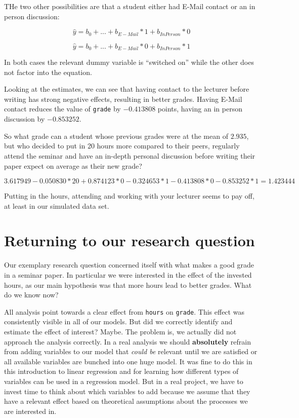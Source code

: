 \documentclass[
]{book}
\begin{document}
THe two other possibilities are that a student either had E-Mail contact or an
in person discussion:

\[\hat{y} = b_0 + ... + b_{E-Mail} * 1 + b_{In Person} * 0\]

\[\hat{y} = b_0 + ... + b_{E-Mail} * 0 + b_{In Person} * 1\]

In both cases the relevant dummy variable is ``switched on'' while the other does
not factor into the equation.

Looking at the estimates, we can see that having contact to the lecturer before
writing has strong negative effects, resulting in better grades. Having E-Mail
contact reduces the value of \texttt{grade} by \(-0.413808\) points, having an in person
discussion by \(-0.853252\).

So what grade can a student whose previous grades were at the mean of \(2.935\),
but who decided to put in 20 hours more compared to their peers, regularly
attend the seminar and have an in-depth personal discussion before writing their
paper expect on average as their new grade?

\[3.617949 - 0.050830 * 20 + 0.874123 * 0 - 0.324653 * 1 - 0.413808 * 0 - 0.853252 * 1 = 1.423444\]

Putting in the hours, attending and working with your lecturer seems to pay off,
at least in our simulated data set.

\hypertarget{returning-to-our-research-question}{%
\section{Returning to our research question}\label{returning-to-our-research-question}}

Our exemplary research question concerned itself with what makes a good grade in
a seminar paper. In particular we were interested in the effect of the invested
hours, as our main hypothesis was that more hours lead to better grades. What do
we know now?

All analysis point towards a clear effect from \texttt{hours} on \texttt{grade}. This effect
was consistently visible in all of our models. But did we correctly identify
and estimate the effect of interest? Maybe. The problem is, we actually did not
approach the analysis correctly. In a real analysis we should \textbf{absolutely}
refrain from adding variables to our model that \emph{could be} relevant until we are
satisfied or all available variables are bunched into one huge model. It was
fine to do this in this introduction to linear regression and for learning how
different types of variables can be used in a regression model. But in a real
project, we have to invest time to think about which variables to add because we
assume that they have a relevant effect based on theoretical assumptions about
the processes we are interested in.
\end{document}
